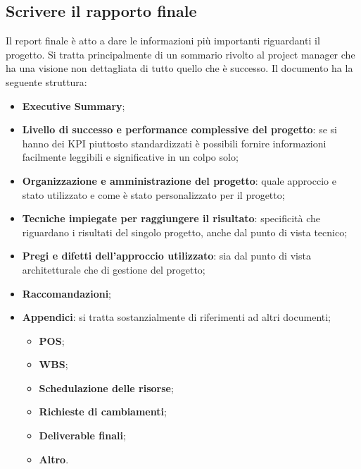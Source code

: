 \subsection{Scrivere il rapporto finale}
Il report finale è atto a dare le informazioni più importanti riguardanti il progetto. Si tratta principalmente di un sommario rivolto al project manager che ha una visione non dettagliata di tutto quello che è successo. Il documento ha la seguente struttura:
\begin{itemize}
	\item \textbf{Executive Summary};
	\item \textbf{Livello di successo e performance complessive del progetto}: se si hanno dei KPI piuttosto standardizzati è possibili fornire informazioni facilmente leggibili e significative in un colpo solo;
	\item \textbf{Organizzazione e amministrazione del progetto}: quale approccio e stato utilizzato e come è stato personalizzato per il progetto;
	\item \textbf{Tecniche impiegate per raggiungere il risultato}: specificità che riguardano i risultati del singolo progetto, anche dal punto di vista tecnico;
	\item \textbf{Pregi e difetti dell’approccio utilizzato}: sia dal punto di vista architetturale che di gestione del progetto;
	\item \textbf{Raccomandazioni};
	\item \textbf{Appendici}: si tratta sostanzialmente di riferimenti ad altri documenti;
	\begin{itemize}
		\item \textbf{POS};
		\item \textbf{WBS};
		\item \textbf{Schedulazione delle risorse};
		\item \textbf{Richieste di cambiamenti};
		\item \textbf{Deliverable finali};
		\item \textbf{Altro}.
	\end{itemize}
\end{itemize}
